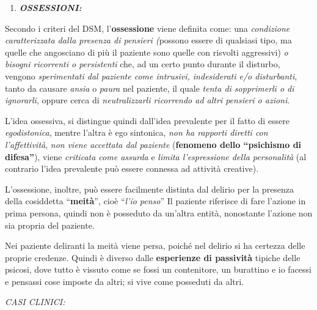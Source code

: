 \documentclass[]{article}
\begin{document}
\begin{enumerate}
\def\labelenumi{\arabic{enumi}.}
\item
  \textbf{\emph{OSSESSIONI:}}
\end{enumerate}

Secondo i criteri del DSM, l'\textbf{ossessione} viene definita come:
una \emph{condizione caratterizzata dalla presenza di pensieri (}possono
essere di qualsiasi tipo, ma quelle che angosciano di più il paziente
sono quelle con risvolti aggressivi) \emph{o bisogni ricorrenti o
persistenti} che, ad un certo punto durante il disturbo, vengono
\emph{sperimentati dal paziente come intrusivi, indesiderati e/o
disturbanti}, tanto da causare \emph{ansia} o \emph{paura} nel paziente,
il quale \emph{tenta di sopprimerli o di ignorarli}, oppure cerca di
\emph{neutralizzarli ricorrendo ad altri pensieri o azioni}.

L'idea ossessiva, si distingue quindi dall'idea prevalente per il fatto
di essere \emph{egodistonica}, mentre l'altra è ego sintonica, \emph{non
ha rapporti diretti con l'affettività}, \emph{non viene accettata dal
paziente} (\textbf{fenomeno dello ``psichismo di difesa''}), viene
\emph{criticata come assurda} e \emph{limita l'espressione della
personalità} (al contrario l'idea prevalente può essere connessa ad
attività creative).

L'ossessione, inoltre, può essere facilmente distinta dal delirio per la
presenza della cosiddetta ``\textbf{meità}'', cioè ``\emph{l'io penso}''
Il paziente riferisce di fare l'azione in prima persona, quindi non è
posseduto da un'altra entità, nonostante l'azione non sia propria del
paziente.

Nei paziente deliranti la meità viene persa, poiché nel delirio si ha
certezza delle proprie credenze. Quindi è diverso dalle
\textbf{esperienze di passività} tipiche delle psicosi, dove tutto è
vissuto come se fossi un contenitore, un burattino e io facessi e
pensassi cose imposte da altri; si vive come posseduti da altri.

\emph{\emph{CASI CLINICI:}}
\end{document}
